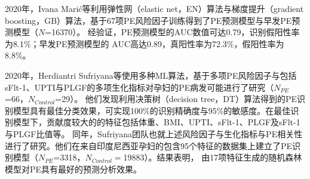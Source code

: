 2020年，Ivana Mari{\'{c}}等\cite{Maric2020}利用弹性网（elastic net，EN）算法与梯度提升（gradient boosting，GB）算法，基于67项PE风险因子训练得到了PE预测模型与早发PE预测模型（$N$=16370）。
经验证，PE预测模型的AUC数值可达0.79，识别假阳性率为8.1\%；早发PE预测模型的
AUC高达0.89，真阳性率为72.3\%，假阳性率为8.8\%。

2020年，Herdiantri Sufriyana等\cite{Sufriyana2020-1}使用多种ML算法，基于多项PE风险因子与包括sFlt-1、UPTI与PLGF的多项生化指标对孕妇的PE病发可能进行了研究（$N_{PE}$=66，$N_{Control}$=29）。
他们发现利用决策树（decision tree，DT）算法得到的PE识别模型具有最佳分类效果，可实现100\%的识别精确度与95\%的敏感度。在最佳识别模型下，贡献度较大的的特征包括体重、BMI、UPTI、sFlt-1、PLGF及sFlt-1与PLGF比值等。
同年，Sufriyana团队也就上述风险因子与生化指标与PE相关性进行了研究\cite{Sufriyana2020}。他们在来自印度尼西亚孕妇的包含95个特征的数据集上建立了PE识别模型（$N_{PE}$=3318，$N_{Control}=$19883）。结果表明，
由17项特征生成的随机森林模型对PE具有最好的预测分析效果。


